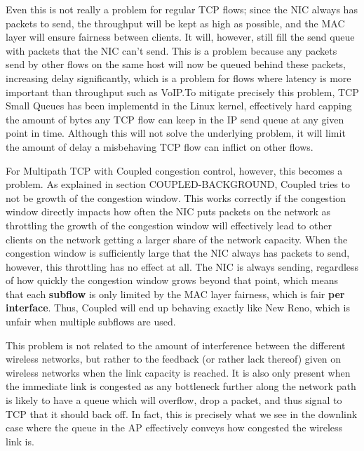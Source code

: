 Even this is not really a problem for regular TCP flows; since the NIC always
has packets to send, the throughput will be kept as high as possible, and the
MAC layer will ensure fairness between clients. It will, however, still fill the
send queue with packets that the NIC can't send. This is a problem because any
packets send by other flows on the same host will now be queued behind these
packets, increasing delay significantly, which is a problem for flows where
latency is more important than throughput such as VoIP.\@  To mitigate precisely
this problem, TCP Small Queues has been implementd in the Linux kernel,
effectively hard capping the amount of bytes any TCP flow can keep in the IP
send queue at any given point in time. Although this will not solve the
underlying problem, it will limit the amount of delay a misbehaving TCP flow can
inflict on other flows.

For Multipath TCP with Coupled congestion control, however, this becomes a
problem. As explained in section COUPLED-BACKGROUND, Coupled tries to not be   %
growth of the congestion window. This works correctly if the congestion window
directly impacts how often the NIC puts packets on the network as throttling the
growth of the congestion window will effectively lead to other clients on the
network getting a larger share of the network capacity. When the congestion
window is sufficiently large that the NIC always has packets to send, however,
this throttling has no effect at all. The NIC is always sending, regardless of
how quickly the congestion window grows beyond that point, which means that each
\textbf{subflow} is only limited by the MAC layer fairness, which is fair
\textbf{per interface}. Thus, Coupled will end up behaving exactly like New
Reno, which is unfair when multiple subflows are used.

This problem is not related to the amount of interference between the different
wireless networks, but rather to the feedback (or rather lack thereof) given on
wireless networks when the link capacity is reached. It is also only present
when the immediate link is congested as any bottleneck further along the network
path is likely to have a queue which will overflow, drop a packet, and thus
signal to TCP that it should back off. In fact, this is precisely what we see in
the downlink case where the queue in the AP effectively conveys how congested
the wireless link is.

